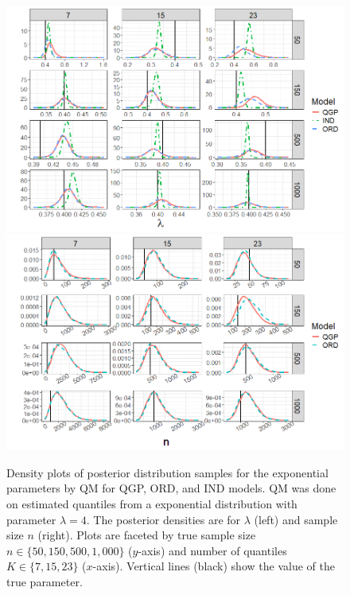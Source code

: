 \documentclass[preprint,12pt,authoryear]{elsarticle}
\begin{document}
\begin{figure}

\centering
  \centering
  \hspace{-.8cm}
  \includegraphics[width=.94\linewidth]{Images/exponential_par_fit.png}
  \centering
  \hspace{-.9cm}
  \includegraphics[width=1.05\linewidth]{Images/exponential_n_fit.png}
\caption{Density plots of posterior distribution samples for the exponential 
parameters by QM for QGP, ORD, and IND models. QM was done on estimated 
quantiles from a exponential distribution with parameter $\lambda = 4$. The 
posterior densities are for $\lambda$ (left) and sample size $n$ (right). Plots 
are faceted by true sample size $n \in \{50, 150, 500, 1{,}000\}$ ($y$-axis) 
and number of quantiles $K \in \{7, 15, 23\}$ ($x$-axis). Vertical lines 
(black) show the value of the true parameter.}
\label{fig:exp_par_fit}
\end{figure}
\end{document}
